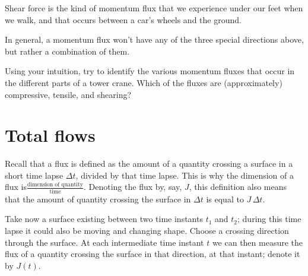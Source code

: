 \documentclass[a4paper,12pt,%
onecolumn,oneside,titlepage,%
british%
]{memoir}
\newcommand*{\incr}{\Delta}%
\renewcommand*{\|}[1][]{\nonscript\:#1\vert\nonscript\:\mathopen{}}
\newcommand*{\yJ}{J}
\newcommand*{\Dt}{\incr t}
\begin{document}
Shear force is the kind of momentum flux that we experience under our feet when we walk, and that occurs between a car's wheels and the ground.

\bigskip

In general, a momentum flux won't have any of the three special directions above, but rather a combination of them.


\begin{exercise}
  Using your intuition, try to identify the various momentum fluxes that occur in the different parts of a tower crane. Which of the fluxes are (approximately) compressive, tensile, and shearing?
\end{exercise}

\section{Total flows}
\label{sec:total_flow}

Recall that a flux is defined as the amount of a quantity crossing a surface in a short time lapse $\Dt$, divided by that time lapse. This is why the dimension of a flux is\enspace$\frac{\text{dimension of quantity}}{\text{time}}$. Denoting the flux by, say, $\yJ$, this definition also means that the amount of quantity crossing the surface in $\Dt$ is equal to $\yJ\,\Dt$.

Take now a surface existing between two time instants $t_{1}$ and $t_{2}$; during this time lapse it could also be moving and changing shape. Choose a crossing direction through the surface. At each intermediate time instant $t$ we can then measure the flux of a quantity crossing the surface in that direction, at that instant; denote it by $\yJ(t)$.
\end{document}
